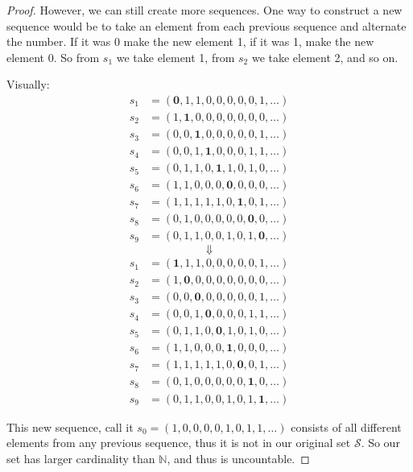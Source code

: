 \documentclass[12pt,letterpaper]{article}
\begin{document}
\begin{enumerate}
\begin{proof}
        However, we can still create more sequences.
        One way to construct a new sequence would be to take an element from each previous sequence and alternate the number.
        If it was 0 make the new element 1, if it was 1, make the new element 0.
        So from $s_1$ we take element 1, from $s_2$ we take element 2, and so on.

        Visually:
        \begin{align*}
          s_1 &= (\mathbf{0}, 1, 1, 0, 0, 0, 0, 0, 1, \dots) \\
          s_2 &= (1, \mathbf{1}, 0, 0, 0, 0, 0, 0, 0, \dots) \\
          s_3 &= (0, 0, \mathbf{1}, 0, 0, 0, 0, 0, 1, \dots) \\
          s_4 &= (0, 0, 1, \mathbf{1}, 0, 0, 0, 1, 1, \dots) \\
          s_5 &= (0, 1, 1, 0, \mathbf{1}, 1, 0, 1, 0, \dots) \\
          s_6 &= (1, 1, 0, 0, 0, \mathbf{0}, 0, 0, 0, \dots) \\
          s_7 &= (1, 1, 1, 1, 1, 0, \mathbf{1}, 0, 1, \dots) \\
          s_8 &= (0, 1, 0, 0, 0, 0, 0, \mathbf{0}, 0, \dots) \\
          s_9 &= (0, 1, 1, 0, 0, 1, 0, 1, \mathbf{0}, \dots)
        \end{align*}
        \[\Downarrow\]
        \begin{align*}
          s_1 &= (\mathbf{1}, 1, 1, 0, 0, 0, 0, 0, 1, \dots) \\
          s_2 &= (1, \mathbf{0}, 0, 0, 0, 0, 0, 0, 0, \dots) \\
          s_3 &= (0, 0, \mathbf{0}, 0, 0, 0, 0, 0, 1, \dots) \\
          s_4 &= (0, 0, 1, \mathbf{0}, 0, 0, 0, 1, 1, \dots) \\
          s_5 &= (0, 1, 1, 0, \mathbf{0}, 1, 0, 1, 0, \dots) \\
          s_6 &= (1, 1, 0, 0, 0, \mathbf{1}, 0, 0, 0, \dots) \\
          s_7 &= (1, 1, 1, 1, 1, 0, \mathbf{0}, 0, 1, \dots) \\
          s_8 &= (0, 1, 0, 0, 0, 0, 0, \mathbf{1}, 0, \dots) \\
          s_9 &= (0, 1, 1, 0, 0, 1, 0, 1, \mathbf{1}, \dots)
        \end{align*}

        This new sequence, call it $s_0 = (1, 0, 0, 0, 0, 1, 0, 1, 1, \dots)$ consists of all different elements from any previous sequence,
        thus it is not in our original set $\mathcal{S}$.
        So our set has larger cardinality than $\mathbb{N}$, and thus is uncountable.
      \end{proof}


\end{enumerate}
\end{document}
